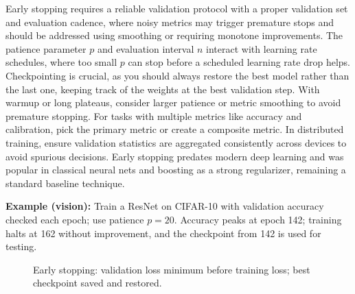 Early stopping requires a reliable validation protocol with a proper validation set and evaluation cadence, where noisy metrics may trigger premature stops and should be addressed using smoothing or requiring monotone improvements. The patience parameter $p$ and evaluation interval $n$ interact with learning rate schedules, where too small $p$ can stop before a scheduled learning rate drop helps. Checkpointing is crucial, as you should always restore the best model rather than the last one, keeping track of the weights at the best validation step. With warmup or long plateaus, consider larger patience or metric smoothing to avoid premature stopping. For tasks with multiple metrics like accuracy and calibration, pick the primary metric or create a composite metric. In distributed training, ensure validation statistics are aggregated consistently across devices to avoid spurious decisions. Early stopping predates modern deep learning and was popular in classical neural nets and boosting as a strong regularizer, remaining a standard baseline technique.

\begin{example}
\textbf{Example (vision):} Train a ResNet on CIFAR-10 with validation accuracy checked each epoch; use patience $p=20$. Accuracy peaks at epoch 142; training halts at 162 without improvement, and the checkpoint from 142 is used for testing.
\end{example}

\begin{figure}[htbp]
\centering
{}
\caption{Early stopping: validation loss minimum before training loss; best checkpoint saved and restored.}
\label{fig:early-stopping-curve}
\end{figure}


